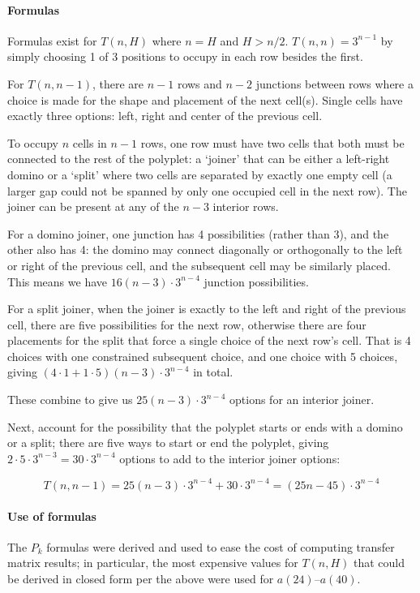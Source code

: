 \documentclass[11pt]{article}
\begin{document}
\paragraph{Formulas} Formulas exist for $T(n,H)$ where $n=H$ and $H>n/2$.  $T(n,n)=3^{n-1}$
by simply choosing 1 of 3 positions to occupy in each row besides the first.

For $T(n, n-1)$, there are $n-1$ rows and $n-2$ junctions between rows where a choice is made for
the shape and placement of the next cell(s).  Single cells have exactly three options: left, right
and center of the previous cell.

To occupy $n$ cells in $n-1$ rows, one row must have two cells that both must be connected to the
rest of the polyplet:  a `joiner' that can be either a left-right domino or a `split' where two
cells are separated by exactly one empty cell (a larger gap could not be spanned by only one
occupied cell in the next row).  The joiner can be present at any of the $n-3$ interior rows.

For a domino joiner, one junction has 4 possibilities (rather than 3), and the other also has
4:  the domino may connect diagonally or orthogonally to the left or right of the previous cell,
and the subsequent cell may be similarly placed.  This means we have $16(n-3)\cdot{}3^{n-4}$ junction
possibilities.


For a split joiner, when the joiner is exactly to the left and right of the previous cell, there are
five possibilities for the next row, otherwise there are four placements for the split that force a
single choice of the next row's cell.  That is 4 choices with one constrained subsequent choice, and
one choice with 5 choices, giving $(4\cdot{}1 + 1\cdot{}5)(n-3)\cdot{}3^{n-4}$ in total.


These combine to give us $25(n-3)\cdot{}3^{n-4}$ options for an interior joiner.

Next, account for the possibility that the polyplet starts or ends with a domino or a split; there
are five ways to start or end the polyplet, giving $2\cdot{}5\cdot{}3^{n-3} = 30\cdot{}3^{n-4}$
options to add to the interior joiner options:


\[
    T(n, n-1) = 25(n-3)\cdot{}3^{n-4} + 30\cdot{}3^{n-4} = (25n - 45)\cdot{}3^{n-4}
\]

\paragraph{Use of formulas} The $P_k$ formulas were derived and used to ease the cost of computing
transfer matrix results; in particular, the most expensive values for $T(n,H)$ that could be derived
in closed form per the above were used for $a(24)$--$a(40)$.



\end{document}
